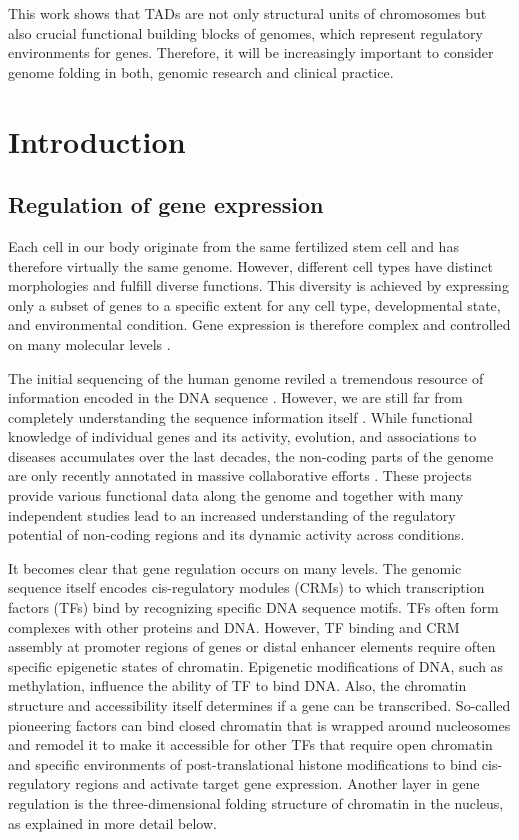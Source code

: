 \documentclass[a4paper,twoside=true,openright,parskip=full,chapterprefix=true,11pt,headings=normal,bibliography=totoc,listof=totoc,titlepage=on,captions=tableabove,draft=false]{scrreprt}
\theoremstyle{definition}
\theoremstyle{definition}
\theoremstyle{definition}
\theoremstyle{remark}
\begin{document}
This work shows that TADs are not only structural units of chromosomes
but also crucial functional building blocks of genomes, which represent
regulatory environments for genes. Therefore, it will be increasingly
important to consider genome folding in both, genomic research and
clinical practice.

\hypertarget{intro}{%
\chapter{Introduction}\label{intro}}

\hypertarget{regulation-of-expression}{%
\section{Regulation of gene expression}\label{regulation-of-expression}}

Each cell in our body originate from the same fertilized stem cell and
has therefore virtually the same genome. However, different cell types
have distinct morphologies and fulfill diverse functions. This diversity
is achieved by expressing only a subset of genes to a specific extent
for any cell type, developmental state, and environmental condition.
Gene expression is therefore complex and controlled on many molecular
levels \citep{Lelli2012}.

The initial sequencing of the human genome reviled a tremendous resource
of information encoded in the DNA sequence \citep{Lander2001}. However,
we are still far from completely understanding the sequence information
itself \citep{Lander2011}. While functional knowledge of individual
genes and its activity, evolution, and associations to diseases
accumulates over the last decades, the non-coding parts of the genome
are only recently annotated in massive collaborative efforts
\citep{Dunham2012, Kundaje2015, Andersson2014}. These projects provide
various functional data along the genome and together with many
independent studies lead to an increased understanding of the regulatory
potential of non-coding regions and its dynamic activity across
conditions.

It becomes clear that gene regulation occurs on many levels. The genomic
sequence itself encodes cis-regulatory modules (CRMs) to which
transcription factors (TFs) bind by recognizing specific DNA sequence
motifs. TFs often form complexes with other proteins and DNA. However,
TF binding and CRM assembly at promoter regions of genes or distal
enhancer elements require often specific epigenetic states of chromatin.
Epigenetic modifications of DNA, such as methylation, influence the
ability of TF to bind DNA. Also, the chromatin structure and
accessibility itself determines if a gene can be transcribed. So-called
pioneering factors can bind closed chromatin that is wrapped around
nucleosomes and remodel it to make it accessible for other TFs that
require open chromatin and specific environments of post-translational
histone modifications to bind cis-regulatory regions and activate target
gene expression. Another layer in gene regulation is the
three-dimensional folding structure of chromatin in the nucleus, as
explained in more detail below.
\end{document}
